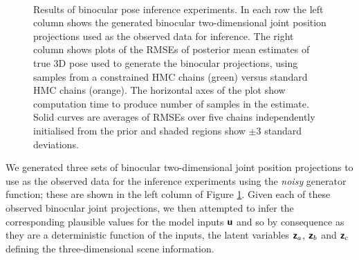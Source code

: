 \begin{figure}
\begin{subfigure}[b]{0.4\textwidth}
  \vspace{1cm}
\end{subfigure}
~~
\begin{subfigure}[b]{0.55\textwidth}
\end{subfigure}
\caption[Binocular pose inference results.]{Results of binocular pose inference experiments. In each row the left column shows the generated binocular two-dimensional joint position projections used as the observed data for inference. The right column shows plots of the \acp{RMSE} of posterior mean estimates of true 3D pose used to generate the binocular projections, using samples from a constrained \ac{HMC} chains (green) versus standard \ac{HMC} chains (orange). The horizontal axes of the plot show computation time to produce number of samples in the estimate. Solid curves are averages of \acp{RMSE} over five chains independently initialised from the prior and shaded regions show $\pm 3$ standard deviations.}
\label{fig:pose-inference}
\end{figure}

We generated three sets of binocular two-dimensional joint position projections to use as the observed data for the inference experiments using the \emph{noisy} generator function; these are shown in the left column of Figure \ref{fig:pose-inference}. Given each of these observed binocular joint projections, we then attempted to infer the corresponding plausible values for the model inputs $\boldsymbol{\mathsf{u}}$ and so by consequence as they are a deterministic function of the inputs, the latent variables $\boldsymbol{\mathsf{z}}_a$, $\boldsymbol{\mathsf{z}}_b$ and $\boldsymbol{\mathsf{z}}_c$ defining the three-dimensional scene information.


